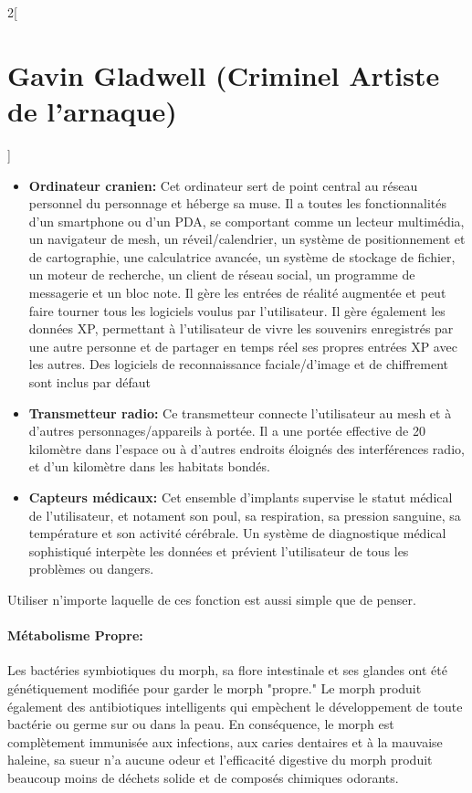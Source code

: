 \documentclass[a4paper,9pt]{article}
\begin{document}
\begin{multicols}{2}[\section*{Gavin Gladwell (Criminel Artiste de l'arnaque)}]
\begin{itemize}
   \item \textbf{Ordinateur cranien:} Cet ordinateur sert de point central au
      réseau personnel du personnage et héberge sa muse. Il a toutes
      les fonctionnalités d'un smartphone ou d'un PDA, se comportant comme un
      lecteur multimédia, un navigateur de mesh, un réveil/calendrier, un
      système de positionnement et de cartographie, une calculatrice avancée,
      un système de stockage de fichier, un moteur de recherche, un client de
      réseau social, un programme de messagerie et un bloc note. Il gère les
      entrées de réalité augmentée et peut faire tourner tous les logiciels
      voulus par l'utilisateur. Il gère également les données XP, permettant à
      l'utilisateur de vivre les souvenirs enregistrés par une autre personne et
      de partager en temps réel ses propres entrées XP avec les autres. Des
      logiciels de reconnaissance faciale/d'image et de chiffrement
      sont inclus par défaut
   \item \textbf{Transmetteur radio:} Ce transmetteur connecte l'utilisateur au
      mesh et à d'autres personnages/appareils à portée. Il a une portée
      effective de 20 kilomètre dans l'espace ou à d'autres endroits éloignés
      des interférences radio, et d'un kilomètre dans les habitats bondés.
   \item \textbf{Capteurs médicaux:} Cet ensemble d'implants supervise le
      statut médical de l'utilisateur, et notament son poul, sa respiration, sa
      pression sanguine, sa température et son activité cérébrale. Un système de
      diagnostique médical sophistiqué interpète les données et prévient
      l'utilisateur de tous les problèmes ou dangers.
\end{itemize} 

Utiliser n'importe laquelle de ces fonction est aussi simple que de penser.

\paragraph{Métabolisme Propre:} Les bactéries symbiotiques du morph, sa flore
intestinale et ses glandes ont été génétiquement modifiée pour garder le morph
"propre." Le morph produit également des antibiotiques intelligents qui empèchent
le développement de toute bactérie ou germe sur ou dans la peau. En
conséquence, le morph est complètement immunisée aux infections, aux caries
dentaires et à la mauvaise haleine, sa sueur n'a aucune odeur et l'efficacité
digestive du morph produit beaucoup moins de déchets solide et de composés
chimiques odorants.


\end{multicols}
\end{document}
